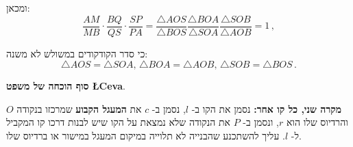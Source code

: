 \np

ומכאן:
\[
\frac{AM}{MB}\cdot\frac{BQ}{QS}\cdot\frac{SP}{PA} = \frac{\triangle AOS}{\triangle BOS}\frac{\triangle BOA}{\triangle SOA}\frac{\triangle SOB}{\triangle AOB}=1\,,
\]

כי סדר הקודקודים במשולש לא משנה:
\[
\triangle AOS=\triangle SOA,\, \triangle BOA=\triangle AOB,\, \triangle SOB=\triangle BOS\,.
\]

\vspace{-4ex}

\textbf{סוף הוכחה של משפט \L{Ceva}}.

\medskip

\textbf{%
מקרה שני, כל קו אחר:
}
נסמן את הקו ב-%
$l$,
נסמן ב-%
$c$
את
\textbf{%
המעגל הקבוע%
}
שמרכזו בנקודה
$O$
והרדיוס שלו הוא
$r$,
ונסמן ב-%
$P$
את הנקודה שלא נמצאת על הקו שיש לבנות דרכו קו המקביל ל-%
$l$.
עליך להשתכנע שהבנייה לא תלוייה במיקום המעגל במישור או ברדיוס שלו.

